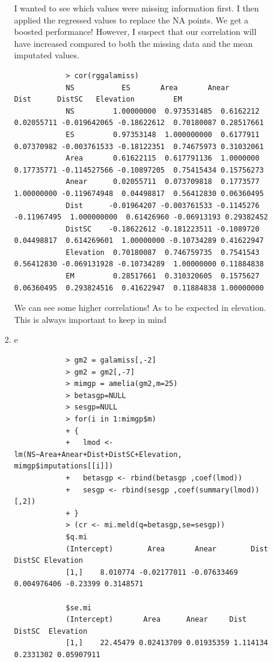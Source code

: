 \documentclass[11pt]{article}
\begin{document}
\begin{enumerate}
\begin{enumerate}
\begin{enumerate}
\begin{verbatim}
		\end{verbatim}
		I wanted to see which values were missing information first. I then applied the regressed values to replace the NA points. We get a boosted performance! However, I suspect that our correlation will have increased compared to both the missing data and the mean imputated values.
		\begin{verbatim}
			> cor(rggalamiss)
			NS           ES       Area       Anear         Dist      DistSC   Elevation         EM
			NS         1.00000000  0.973531485  0.6162212  0.02055711 -0.019642065 -0.18622612  0.70180087 0.28517661
			ES         0.97353148  1.000000000  0.6177911  0.07370982 -0.003761533 -0.18122351  0.74675973 0.31032061
			Area       0.61622115  0.617791136  1.0000000  0.17735771 -0.114527566 -0.10897205  0.75415434 0.15756273
			Anear      0.02055711  0.073709818  0.1773577  1.00000000 -0.119674948  0.04498817  0.56412830 0.06360495
			Dist      -0.01964207 -0.003761533 -0.1145276 -0.11967495  1.000000000  0.61426960 -0.06913193 0.29382452
			DistSC    -0.18622612 -0.181223511 -0.1089720  0.04498817  0.614269601  1.00000000 -0.10734289 0.41622947
			Elevation  0.70180087  0.746759735  0.7541543  0.56412830 -0.069131928 -0.10734289  1.00000000 0.11884838
			EM         0.28517661  0.310320605  0.1575627  0.06360495  0.293824516  0.41622947  0.11884838 1.00000000
		\end{verbatim}
		We can see some higher correlations! As to be expected in elevation. This is always important to keep in mind
		\item e
		\begin{verbatim}
			> gm2 = galamiss[,-2]
			> gm2 = gm2[,-7]
			> mimgp = amelia(gm2,m=25)		
			> betasgp=NULL
			> sesgp=NULL
			> for(i in 1:mimgp$m)
			+ {
			+   lmod <- lm(NS~Area+Anear+Dist+DistSC+Elevation, mimgp$imputations[[i]])
			+   betasgp <- rbind(betasgp ,coef(lmod))
			+   sesgp <- rbind(sesgp ,coef(summary(lmod))[,2])
			+ }
			> (cr <- mi.meld(q=betasgp,se=sesgp))
			$q.mi
			(Intercept)        Area       Anear        Dist   DistSC Elevation
			[1,]    8.010774 -0.02177011 -0.07633469 0.004976406 -0.23399 0.3148571
			
			$se.mi
			(Intercept)       Area      Anear     Dist    DistSC  Elevation
			[1,]    22.45479 0.02413709 0.01935359 1.114134 0.2331302 0.05907911
			

\end{verbatim}
\end{enumerate}
\end{enumerate}
\end{enumerate}
\end{document}
